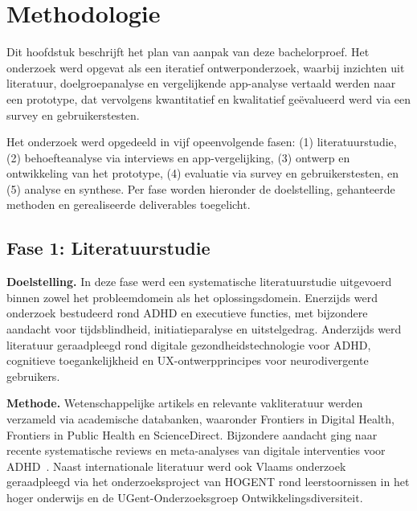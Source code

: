 
\chapter{Methodologie}%
\label{ch:methodologie}

Dit hoofdstuk beschrijft het plan van aanpak van deze bachelorproef. Het onderzoek
werd opgevat als een iteratief ontwerponderzoek, waarbij inzichten uit literatuur,
doelgroepanalyse en vergelijkende app-analyse vertaald werden naar een prototype,
dat vervolgens kwantitatief en kwalitatief geëvalueerd werd via een survey en
gebruikerstesten.

Het onderzoek werd opgedeeld in vijf opeenvolgende fasen: (1) literatuurstudie,
(2) behoefteanalyse via interviews en app-vergelijking, (3) ontwerp en ontwikkeling
van het prototype, (4) evaluatie via survey en gebruikerstesten, en (5) analyse en
synthese. Per fase worden hieronder de doelstelling, gehanteerde methoden en
gerealiseerde deliverables toegelicht.

\section{Fase 1: Literatuurstudie}

\textbf{Doelstelling.}
In deze fase werd een systematische literatuurstudie uitgevoerd binnen zowel het
probleemdomein als het oplossingsdomein. Enerzijds werd onderzoek bestudeerd rond
ADHD en executieve functies, met bijzondere aandacht voor tijdsblindheid,
initiatieparalyse en uitstelgedrag. Anderzijds werd literatuur geraadpleegd rond
digitale gezondheidstechnologie voor ADHD, cognitieve toegankelijkheid en
UX-ontwerpprincipes voor neurodivergente gebruikers.

\textbf{Methode.}
Wetenschappelijke artikels en relevante vakliteratuur werden verzameld via academische
databanken, waaronder Frontiers in Digital Health, Frontiers in Public Health en
ScienceDirect. Bijzondere aandacht ging naar recente systematische reviews en
meta-analyses van digitale interventies voor ADHD~\autocite{Schofield2026,
Hosseinnia2025}. Naast internationale literatuur werd ook Vlaams onderzoek
geraadpleegd via het onderzoeksproject van HOGENT rond leerstoornissen in het hoger
onderwijs en de UGent-Onderzoeksgroep Ontwikkelingsdiversiteit.

